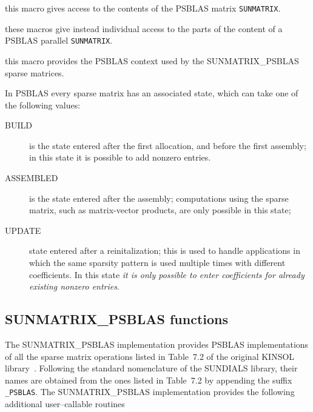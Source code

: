 \documentclass[twoside,a4paper]{refart}
\theoremstyle{definition}
\begin{document}
 this macro gives access to the contents of the PSBLAS matrix \texttt{SUNMATRIX}.

 these macros give instead individual access to the parts of the content of a PSBLAS parallel \texttt{SUNMATRIX}.

 this macro provides the PSBLAS context used by the SUNMATRIX\_PSBLAS sparse matrices.

In PSBLAS every sparse matrix has an associated state, which can take one of the following
values:
\begin{description}
\item[BUILD] is the state entered after the first allocation, and before the first assembly; in
this state it is possible to add nonzero entries.
\item[ASSEMBLED] is the state entered after the assembly; computations using the sparse
matrix, such as matrix-vector products, are only possible in this state;
\item[UPDATE] state entered after a reinitalization; this is used to handle applications
in which the same sparsity pattern is used multiple times with different
coefficients. \attention In this state \textit{it is only possible to enter coefficients for already
existing nonzero entries}.
\end{description}

\subsection{SUNMATRIX\_PSBLAS functions}

The SUNMATRIX\_PSBLAS implementation provides PSBLAS implementations of all the sparse matrix operations listed in Table~7.2 of the original KINSOL library~\cite{kinsolguide}. Following the standard nomenclature of the SUNDIALS library, their names are obtained from the ones listed in Table~7.2 by appending the suffix \texttt{\_PSBLAS}. The SUNMATRIX\_PSBLAS implementation provides the following additional user--callable routines
\end{document}
